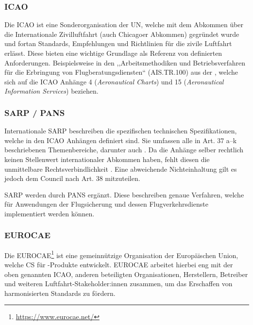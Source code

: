 \subsubsection{ICAO}

    Die \acf{ICAO} ist eine Sonderorganisation der \acf{UN}, welche mit dem Abkommen über die Internationale Zivilluftfahrt (auch Chicagoer Abkommen) gegründet wurde und fortan Standards, Empfehlungen und Richtlinien für die zivile Luftfahrt erlässt. 
    Diese bieten eine wichtige Grundlage als Referenz von definierten Anforderungen. 
    Beispielsweise in den ,,Arbeitsmethodiken und Betriebsverfahren für die Erbringung von Flugberatungsdiensten`` (\textsf{AIS.TR.100}) aus der , welche sich auf die \ac{ICAO} Anhänge 4 (\textit{Aeronautical Charts}) und 15 (\textit{Aeronautical Information Services}) beziehen.
    \cite[Anh. IV]{2017R0373}
    
\subsubsection{SARP / PANS}

    Internationale \acf{SARP} beschreiben die spezifischen technischen Spezifikationen, welche in den \ac{ICAO} Anhängen definiert sind.
    Sie umfassen alle in Art. 37 a--k beschriebenen Themenbereiche, darunter auch \atmans 
    \cite[S. 43f.]{icao_convention}.
    Da die Anhänge selber rechtlich keinen Stellenwert internationaler Abkommen haben, fehlt diesen die unmittelbare Rechtsverbindlichkeit 
    \cite[156--159]{eu_icao_milde}.
    Eine abweichende Nichteinhaltung gilt es jedoch dem Council nach Art. 38 mitzuteilen. \cite[S. 45f]{icao_convention}
    
    \ac{SARP} werden durch \ac{PANS} ergänzt. 
    Diese beschreiben genaue Verfahren, welche für Anwendungen der Flugsicherung und dessen Flugverkehrsdienste implementiert werden können. 

\subsubsection{EUROCAE}

    Die \acf{EUROCAE}\footnote{\href{https://www.eurocae.net/}{https://www.eurocae.net/}} ist eine gemeinnützige Organisation der Europäischen Union, welche \acf{CS} für \atmans-Produkte entwickelt. 
    \ac{EUROCAE} arbeitet hierbei eng mit der oben genannten \ac{ICAO}, anderen beteiligten Organisationen, Herstellern, Betreiber und weiteren Luft\-fahrt-Stakeholder:innen zusammen, um das Erschaffen von harmonisierten Standards zu fördern.

